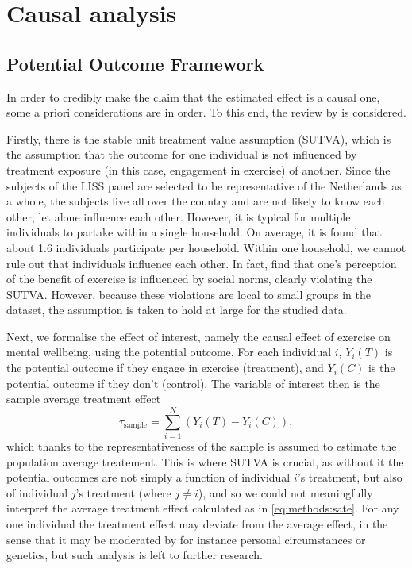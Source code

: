 \section{Causal analysis}
\label{sec:methods:causal}

\subsection{Potential Outcome Framework}

In order to credibly make the claim that the estimated effect is a causal one, some a priori considerations are in order.
To this end, the review by  is considered.

Firstly, there is the stable unit treatment value assumption (SUTVA), which is the assumption that the outcome for one
individual is not influenced by treatment exposure (in this case, engagement in exercise) of another.
Since the subjects of the LISS panel are selected to be representative of the Netherlands as a whole, the subjects
live all over the country and are not likely to know each other, let alone influence each other. However, it is typical
for multiple individuals to partake within a single household. On average, it is found that about 1.6 individuals participate
per household. Within one household, we cannot rule out that individuals influence each other. In fact, 
find that one's perception of the benefit of exercise is influenced by social norms, clearly violating the SUTVA.
However, because these violations are local to small groups in the dataset, the assumption is taken to hold at large for
the studied data.

Next, we formalise the effect of interest, namely the causal effect of exercise on mental wellbeing, using the
potential outcome.
For each individual $i$, $Y_i(T)$ is the potential outcome if they engage in exercise (treatment),
and $Y_i(C)$ is the potential outcome if they don't (control). The variable of interest then is the sample average
treatment effect
\begin{equation}
\label{eq:methods:sate}
    \tau_{\text{sample}} = \sum_{i=1}^N (Y_i(T) - Y_i(C)),
\end{equation}
which thanks to the representativeness of the sample is assumed to estimate the population average treatement.
This is where SUTVA is crucial, as without it the potential outcomes are not simply a function of individual $i$'s treatment,
but also of individual $j$'s treatment (where $j \neq i$), and so we could not meaningfully interpret the average
treatment effect calculated as in \cref{eq:methods:sate}.
For any one individual the treatment effect may deviate from the average effect, in the sense that it may be moderated by
for instance personal circumstances or genetics, but such analysis is left to further research.

